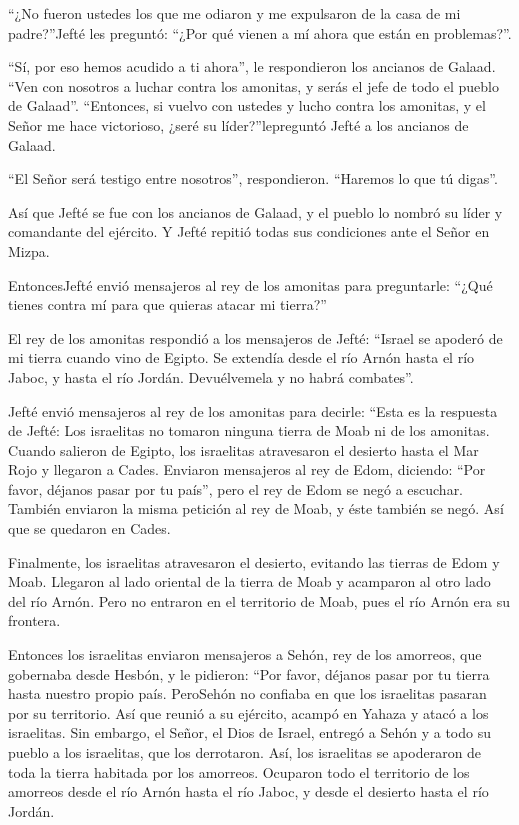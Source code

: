  ``¿No fueron ustedes los que me odiaron y me expulsaron de
la casa de mi padre?''Jefté les preguntó: ``¿Por qué vienen a mí ahora
que están en problemas?''.

 ``Sí, por eso hemos acudido a ti ahora'', le respondieron
los ancianos de Galaad. ``Ven con nosotros a luchar contra los amonitas,
y serás el jefe de todo el pueblo de Galaad''.  ``Entonces,
si vuelvo con ustedes y lucho contra los amonitas, y el Señor me hace
victorioso, ¿seré su líder?''lepreguntó Jefté a los ancianos de Galaad.

 ``El Señor será testigo entre nosotros'', respondieron.
``Haremos lo que tú digas''.

 Así que Jefté se fue con los ancianos de Galaad, y el
pueblo lo nombró su líder y comandante del ejército. Y Jefté repitió
todas sus condiciones ante el Señor en Mizpa.

 EntoncesJefté envió mensajeros al rey de los amonitas para
preguntarle: ``¿Qué tienes contra mí para que quieras atacar mi
tierra?''

 El rey de los amonitas respondió a los mensajeros de
Jefté: ``Israel se apoderó de mi tierra cuando vino de Egipto. Se
extendía desde el río Arnón hasta el río Jaboc, y hasta el río Jordán.
Devuélvemela y no habrá combates''.

 Jefté envió mensajeros al rey de los amonitas
 para decirle: ``Esta es la respuesta de Jefté: Los
israelitas no tomaron ninguna tierra de Moab ni de los amonitas.
 Cuando salieron de Egipto, los israelitas atravesaron el
desierto hasta el Mar Rojo y llegaron a Cades.  Enviaron
mensajeros al rey de Edom, diciendo: ``Por favor, déjanos pasar por tu
país'', pero el rey de Edom se negó a escuchar. También enviaron la
misma petición al rey de Moab, y éste también se negó. Así que se
quedaron en Cades.

 Finalmente, los israelitas atravesaron el desierto,
evitando las tierras de Edom y Moab. Llegaron al lado oriental de la
tierra de Moab y acamparon al otro lado del río Arnón. Pero no entraron
en el territorio de Moab, pues el río Arnón era su frontera.

 Entonces los israelitas enviaron mensajeros a Sehón, rey
de los amorreos, que gobernaba desde Hesbón, y le pidieron: ``Por favor,
déjanos pasar por tu tierra hasta nuestro propio país. 
PeroSehón no confiaba en que los israelitas pasaran por su territorio.
Así que reunió a su ejército, acampó en Yahaza y atacó a los israelitas.
 Sin embargo, el Señor, el Dios de Israel, entregó a Sehón
y a todo su pueblo a los israelitas, que los derrotaron. Así, los
israelitas se apoderaron de toda la tierra habitada por los amorreos.
 Ocuparon todo el territorio de los amorreos desde el río
Arnón hasta el río Jaboc, y desde el desierto hasta el río Jordán.

